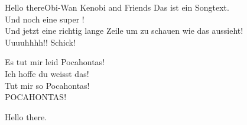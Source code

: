 \begin{song}{Hello there}{Obi-Wan Kenobi and Friends}
    Das ist ein  Songtext. \\
    Und noch eine super ! \\
    Und jetzt eine richtig lange Zeile um zu schauen wie das aussieht! \\
    Uuuuhhhh!! Schick!
    \begin{chorus}
    Es tut mir leid Pocahontas! \\
    Ich hoffe du weisst das! \\
    Tut mir so  Pocahontas! \\
    POCAHONTAS!
    \end{chorus}
    Hello there.
\end{song}
